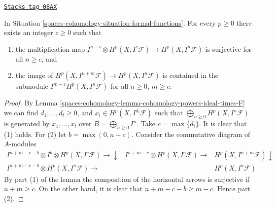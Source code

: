 \begin{lemma}
\label{spaces-cohomology-lemma-cohomology-powers-ideal-application}
\href{https://stacks.math.columbia.edu/tag/08AX}{\texttt{Stacks tag 08AX}}

In Situation \ref{spaces-cohomology-situation-formal-functions}.
For every $p \geq 0$ there exists an integer $c \geq 0$ such that
\begin{enumerate}
\item the multiplication map
$I^{n - c} \otimes H^p(X, I^c\mathcal{F}) \to H^p(X, I^n\mathcal{F})$
is surjective for all $n \geq c$, and
\item the image of $H^p(X, I^{n + m}\mathcal{F}) \to H^p(X, I^n\mathcal{F})$
is contained in the submodule $I^{m - c} H^p(X, I^n\mathcal{F})$
for all $n \geq 0$, $m \geq c$.
\end{enumerate}
\end{lemma}

\begin{proof}
By Lemma \ref{spaces-cohomology-lemma-cohomology-powers-ideal-times-F}
we can find $d_1, \ldots, d_t \geq 0$, and
$x_i \in H^p(X, I^{d_i}\mathcal{F})$ such that
$\bigoplus_{n \geq 0} H^p(X, I^n\mathcal{F})$ is generated
by $x_1, \ldots, x_t$ over $B = \bigoplus_{n \geq 0} I^n$.
Take $c = \max\{d_i\}$. It is clear that (1) holds.
For (2) let $b = \max(0, n - c)$.
Consider the commutative diagram of $A$-modules
$$
\begin{array}{ccc}I^{n + m - c - b} \otimes I^b \otimes
H^p(X, I^c\mathcal{F}) \longrightarrow\downarrow & I^{n + m - c} \otimes H^p(X, I^c\mathcal{F}) \longrightarrow & H^p(X, I^{n + m}\mathcal{F}) \downarrow \\ I^{n + m - c - b} \otimes H^p(X, I^n\mathcal{F}) \longrightarrow &  & H^p(X, I^n\mathcal{F})\end{array}
$$
By part (1) of the lemma the composition of the horizontal arrows
is surjective if $n + m \geq c$. On the other hand, it is clear
that $n + m - c - b \geq m - c$. Hence part (2).
\end{proof}

